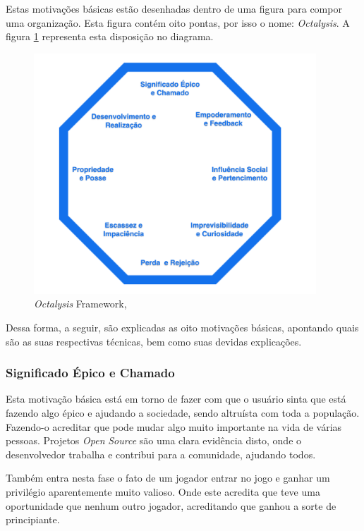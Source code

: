 Estas motivações básicas estão desenhadas dentro de uma figura para
compor uma organização. Esta figura contém oito pontas, por isso o nome:
\textit{Octalysis}. A figura \ref{fig:octalysisframework} representa esta
disposição no diagrama.

\begin{figure}[h]
    \centering
    \includegraphics[width=400px, scale=1]{figuras/octalysisframework}
    \caption{\textit{Octalysis} Framework, \cite{chou2015actionable}}
    \label{fig:octalysisframework}
\end{figure}

Dessa forma, a seguir, são explicadas as oito motivações básicas,
apontando quais são as suas respectivas técnicas, bem como
suas devidas explicações.

\subsubsection{Significado Épico e Chamado}
\label{sub:significadoepico}
Esta motivação básica está em torno de fazer com que o usuário sinta que
está fazendo algo épico e ajudando a sociedade, sendo altruísta com toda
a população. Fazendo-o acreditar que pode mudar algo muito importante
na vida de várias pessoas. Projetos \textit{Open} \textit{Source} são uma clara evidência
disto, onde o desenvolvedor trabalha e contribui para a comunidade, ajudando
todos.

Também entra nesta fase o fato de um jogador entrar no jogo e ganhar um
privilégio aparentemente muito valioso. Onde este acredita que teve uma
oportunidade que nenhum outro jogador, acreditando que ganhou a sorte de
principiante.


